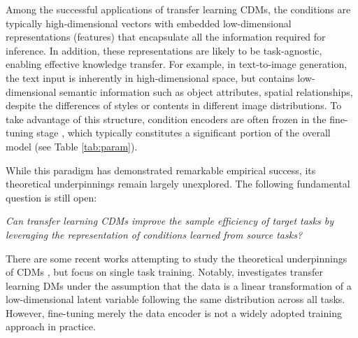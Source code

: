 \documentclass{article}
\numberwithin{equation}{section}
\theoremstyle{definition}
\begin{document}
\begin{table}[ht]
    \centering
    \footnotesize
    \setlength{\tabcolsep}{6pt}
    \caption{Comparing the number of parameters of different parts in CDMs.}
    \label{tab:param}
\end{table}

Among the successful applications of transfer learning CDMs, the conditions are typically high-dimensional vectors with embedded low-dimensional representations (features) that encapsulate all the information required for inference. 
In addition, these representations are likely to be task-agnostic, enabling effective knowledge transfer. 
For example, in text-to-image generation, the text input is inherently in high-dimensional space, but contains low-dimensional semantic information such as object attributes, spatial relationships, despite the differences of styles or contents in different image distributions.
To take advantage of this structure, condition encoders are often frozen in the fine-tuning stage \citep{rombach2022high,esser2024scaling}, which typically constitutes a significant portion of the overall model (see Table \ref{tab:param}).

While this paradigm has demonstrated remarkable empirical success, its theoretical underpinnings remain largely unexplored.
The following fundamental question is still open:
\begin{center}
    \textit{Can transfer learning CDMs improve the sample efficiency of target tasks by leveraging the representation of conditions learned from source tasks?}
\end{center}
There are some recent works attempting to study the theoretical underpinnings of CDMs \citep{fu2024unveil,jiao2024model,hu2024statistical}, but focus on single task training.
Notably, \citet{yang2024fewshot} investigates transfer learning DMs under the assumption that the data is a linear transformation of a low-dimensional latent variable following the same distribution across all tasks.
However, fine-tuning merely the data encoder is not a widely adopted training approach in practice.
\end{document}
